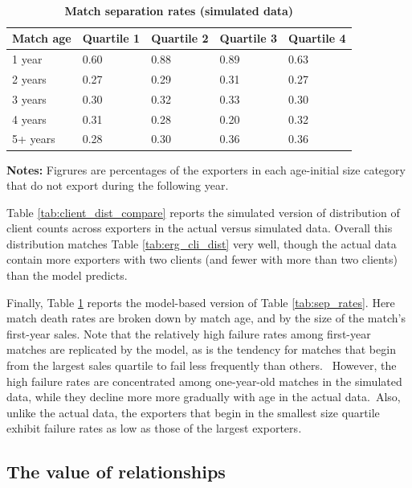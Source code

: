 \documentclass[12pt]{article}
\begin{document}
\begin{table}[tbp]
\caption{\textbf{Match separation rates (simulated data)}}\centering
{\small \ }
\par
{\small 
\begin{tabular}{lllll}
\hline\hline
Match age & Quartile 1 & Quartile 2 & Quartile 3 & Quartile 4 \\ \hline
1 year & 0.60 & 0.88 & 0.89 & 0.63 \\ 
2 years & 0.27 & 0.29 & 0.31 & 0.27 \\ 
3 years & 0.30 & 0.32 & 0.33 & 0.30 \\ 
4 years & 0.31 & 0.28 & 0.20 & 0.32 \\ 
5+ years & 0.28 & 0.30 & 0.36 & 0.36 \\ \hline
\end{tabular}
}
\par
{\endcenter%
\begin{tablenotes}
\item \textbf{Notes:} Figrures are percentages of the exporters in each age-initial size category that do not export during the following year.
\end{tablenotes}}
\label{tab:match_exit_compare}
\end{table}


Table \ref{tab:client_dist_compare} reports the simulated version of distribution of
client counts across exporters in the actual versus simulated data. Overall
this distribution matches Table \ref{tab:erg_cli_dist} very well, though the actual data contain
more exporters with two clients (and fewer with more than two clients) than
the model predicts.

Finally, Table \ref{tab:match_exit_compare} reports the model-based version of Table \ref{tab:sep_rates}. 
Here match death rates are broken
down by match age, and by the size of the match's first-year sales. 
Note that the relatively high failure rates among first-year matches are
replicated by the model, as is the tendency for matches that begin from the
largest sales quartile to fail less frequently than others.\textit{\ }%
However, the high failure rates are concentrated among one-year-old matches
in the simulated data, while they decline more more gradually with age in
the actual data.\textit{\ }Also, unlike the actual data, the exporters that
begin in the smallest size quartile exhibit failure rates as low as those of
the largest exporters\textit{.}


\subsection{The value of relationships}
\end{document}
